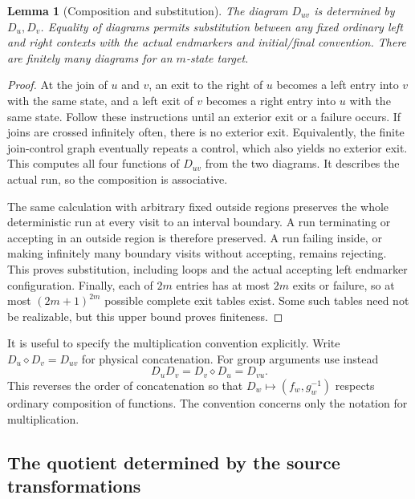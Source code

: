 \documentclass[11pt,a4paper]{article}
\newtheorem{lemma}[theorem]{Lemma}
\theoremstyle{definition}
\theoremstyle{remark}
\begin{document}
\begin{lemma}[Composition and substitution]\label{lem:diagrams}
The diagram $D_{uv}$ is determined by $D_u,D_v$. Equality of diagrams
permits substitution between any fixed ordinary left and right
contexts with the actual endmarkers and initial/final convention.
There are finitely many diagrams for an $m$-state target.
\end{lemma}
\begin{proof}
At the join of $u$ and $v$, an exit to the right of $u$ becomes
a left entry into $v$ with the same state, and a left exit of $v$
becomes a right entry into $u$ with the same state. Follow these
instructions until an exterior exit or a failure occurs. If joins
are crossed infinitely often, there is no exterior exit. Equivalently,
the finite join-control graph eventually repeats a control, which
also yields no exterior exit. This computes all four functions of
$D_{uv}$ from the two diagrams. It describes the actual run, so the
composition is associative.

The same calculation with arbitrary fixed outside regions preserves
the whole deterministic run at every visit to an interval boundary.
A run terminating or accepting in an outside region is therefore
preserved. A run failing inside, or making infinitely many boundary
visits without accepting, remains rejecting. This proves substitution,
including loops and the actual accepting left endmarker configuration. Finally,
each of $2m$ entries has at most $2m$ exits or failure, so at most
$(2m+1)^{2m}$ possible complete exit tables exist. Some such tables
need not be realizable, but this upper bound proves finiteness.
\end{proof}

It is useful to specify the multiplication convention explicitly.
Write $D_u\diamond D_v=D_{uv}$ for physical concatenation. For
group arguments use instead
\begin{equation}\label{eq:product}
                         D_uD_v=D_v\diamond D_u=D_{vu}.
\end{equation}
This reverses the order of concatenation so that
$D_w\mapsto(f_w,g_w^{-1})$ respects ordinary composition of functions.
The convention concerns only the notation for multiplication.

\subsection{The quotient determined by the source transformations}
\end{document}
